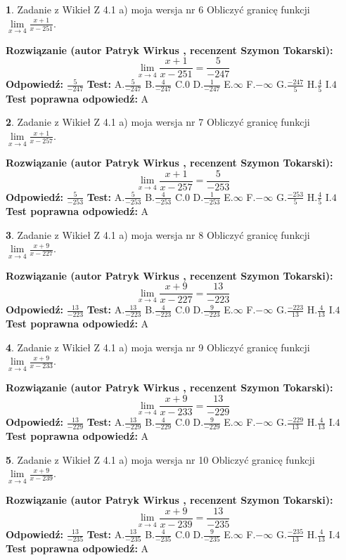 \documentclass[12pt, a4paper]{article}
\theoremstyle{definition} %
\newtheorem{zad}{}
\newcommand{\zadStart}[1]{\begin{zad}#1\newline}
\newcommand{\zadStop}{\end{zad}}
\newcommand{\rozwStart}[2]{\noindent \textbf{Rozwiązanie (autor #1 , recenzent #2): }\newline}
\newcommand{\rozwStop}{\newline}
\newcommand{\odpStart}{\noindent \textbf{Odpowiedź:}\newline}
\newcommand{\odpStop}{\newline}
\newcommand{\testStart}{\noindent \textbf{Test:}\newline}
\newcommand{\testStop}{\newline}
\newcommand{\kluczStart}{\noindent \textbf{Test poprawna odpowiedź:}\newline}
\newcommand{\kluczStop}{\newline}
\begin{document}
\zadStart{Zadanie z Wikieł Z 4.1 a) moja wersja nr 6}
Obliczyć granicę funkcji $\lim\limits_{x\to4}\frac{x+1}{x-251}$.
\zadStop
\rozwStart{Patryk Wirkus}{Szymon Tokarski}
$$\lim\limits_{x\to4}\frac{x+1}{x-251} = \frac{5}{-247}$$
\rozwStop
\odpStart
$\frac{5}{-247}$
\odpStop
\testStart
A.$\frac{5}{-247}$
B.$\frac{4}{-247}$
C.$0$
D.$\frac{1}{-247}$
E.$\infty$
F.$-\infty$
G.$\frac{-247}{5}$
H.$\frac{4}{5}$
I.$4$
\testStop
\kluczStart
A
\kluczStop



\zadStart{Zadanie z Wikieł Z 4.1 a) moja wersja nr 7}
Obliczyć granicę funkcji $\lim\limits_{x\to4}\frac{x+1}{x-257}$.
\zadStop
\rozwStart{Patryk Wirkus}{Szymon Tokarski}
$$\lim\limits_{x\to4}\frac{x+1}{x-257} = \frac{5}{-253}$$
\rozwStop
\odpStart
$\frac{5}{-253}$
\odpStop
\testStart
A.$\frac{5}{-253}$
B.$\frac{4}{-253}$
C.$0$
D.$\frac{1}{-253}$
E.$\infty$
F.$-\infty$
G.$\frac{-253}{5}$
H.$\frac{4}{5}$
I.$4$
\testStop
\kluczStart
A
\kluczStop



\zadStart{Zadanie z Wikieł Z 4.1 a) moja wersja nr 8}
Obliczyć granicę funkcji $\lim\limits_{x\to4}\frac{x+9}{x-227}$.
\zadStop
\rozwStart{Patryk Wirkus}{Szymon Tokarski}
$$\lim\limits_{x\to4}\frac{x+9}{x-227} = \frac{13}{-223}$$
\rozwStop
\odpStart
$\frac{13}{-223}$
\odpStop
\testStart
A.$\frac{13}{-223}$
B.$\frac{4}{-223}$
C.$0$
D.$\frac{9}{-223}$
E.$\infty$
F.$-\infty$
G.$\frac{-223}{13}$
H.$\frac{4}{13}$
I.$4$
\testStop
\kluczStart
A
\kluczStop



\zadStart{Zadanie z Wikieł Z 4.1 a) moja wersja nr 9}
Obliczyć granicę funkcji $\lim\limits_{x\to4}\frac{x+9}{x-233}$.
\zadStop
\rozwStart{Patryk Wirkus}{Szymon Tokarski}
$$\lim\limits_{x\to4}\frac{x+9}{x-233} = \frac{13}{-229}$$
\rozwStop
\odpStart
$\frac{13}{-229}$
\odpStop
\testStart
A.$\frac{13}{-229}$
B.$\frac{4}{-229}$
C.$0$
D.$\frac{9}{-229}$
E.$\infty$
F.$-\infty$
G.$\frac{-229}{13}$
H.$\frac{4}{13}$
I.$4$
\testStop
\kluczStart
A
\kluczStop



\zadStart{Zadanie z Wikieł Z 4.1 a) moja wersja nr 10}
Obliczyć granicę funkcji $\lim\limits_{x\to4}\frac{x+9}{x-239}$.
\zadStop
\rozwStart{Patryk Wirkus}{Szymon Tokarski}
$$\lim\limits_{x\to4}\frac{x+9}{x-239} = \frac{13}{-235}$$
\rozwStop
\odpStart
$\frac{13}{-235}$
\odpStop
\testStart
A.$\frac{13}{-235}$
B.$\frac{4}{-235}$
C.$0$
D.$\frac{9}{-235}$
E.$\infty$
F.$-\infty$
G.$\frac{-235}{13}$
H.$\frac{4}{13}$
I.$4$
\testStop
\kluczStart
A
\kluczStop
\end{document}

